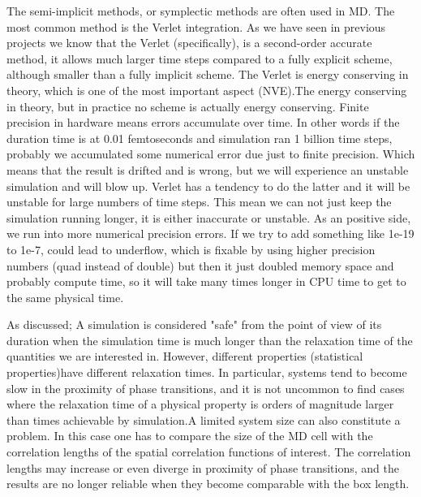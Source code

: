 \documentclass[a4paper]{article}
\begin{document}
The semi-implicit methods, or symplectic methods are often used in MD. The most common method is the Verlet integration. As we have seen in previous projects we know that the Verlet (specifically), is a second-order accurate method, it allows much larger time steps compared to a fully explicit scheme, although smaller than a fully implicit scheme. The Verlet is energy conserving in theory, which is one of the most important aspect (NVE).The energy conserving in theory, but in practice no scheme is actually energy conserving.  Finite precision in hardware means errors accumulate over time. In other words if the duration time is at 0.01 femtoseconds and simulation ran 1 billion time steps, probably we accumulated some numerical error due just to finite precision.  Which means that the result is drifted and is wrong, but we will experience an unstable simulation and will blow up. Verlet has a tendency to do the latter and it will be unstable for large numbers of time steps. This mean  we can not just keep the simulation running longer,  it is either inaccurate or unstable. As an positive side, we run into more numerical precision errors. If we try to add something like 1e-19 to 1e-7, could lead to underflow,  which is  fixable by using higher precision numbers (quad instead of double) but then it just doubled memory space and probably compute time, so it will take many times longer in CPU time to get to the same physical time.

As discussed; A simulation is  considered "safe" from the point of view of its duration when the simulation time is much longer than the relaxation time of the quantities we are interested in. However, different properties (statistical properties)have different relaxation times. In particular, systems tend to become slow in the proximity of phase transitions, and it is not uncommon to find cases where the relaxation time of a physical property is orders of magnitude larger than times achievable by simulation.A limited system size can also constitute a problem. In this case one has to compare the size of the MD cell with the correlation lengths of the spatial correlation functions of interest. The correlation lengths may increase or even diverge in proximity of phase transitions, and the results are no longer reliable when they become comparable with the box length. 
\end{document}
